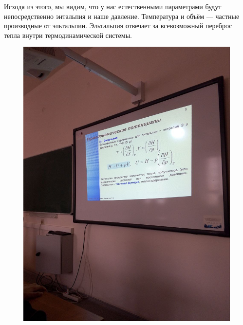\documentclass{article}
\begin{document}
Исходя из этого, мы видим, что у нас естественными параметрами будут непосредственно энтальпия и наше давление. Температура и объём --- частные производные от эльтальпии. Эльтальпия отвечает за всевозможный переброс тепла внутри термодинамической системы.

\begin{figure}[H]
    \includegraphics[width=\textwidth]{4.jpg}
\end{figure}
\end{document}
